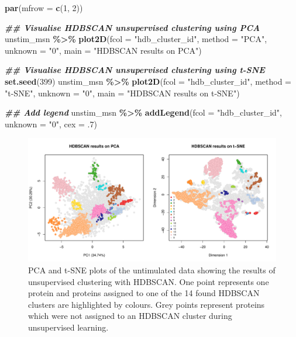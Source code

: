 \documentclass[9pt,a4paper,]{extarticle}
\newenvironment{Shaded}{\begin{snugshade}}{\end{snugshade}}
\newcommand{\AttributeTok}[1]{\textcolor[rgb]{0.13,0.29,0.53}{#1}}
\newcommand{\DecValTok}[1]{\textcolor[rgb]{0.00,0.00,0.81}{#1}}
\newcommand{\DocumentationTok}[1]{\textcolor[rgb]{0.56,0.35,0.01}{\textbf{\textit{#1}}}}
\newcommand{\FunctionTok}[1]{\textcolor[rgb]{0.13,0.29,0.53}{\textbf{#1}}}
\newcommand{\NormalTok}[1]{#1}
\newcommand{\SpecialCharTok}[1]{\textcolor[rgb]{0.81,0.36,0.00}{\textbf{#1}}}
\newcommand{\StringTok}[1]{\textcolor[rgb]{0.31,0.60,0.02}{#1}}
\begin{document}
\begin{Shaded}
\begin{Highlighting}[]
\FunctionTok{par}\NormalTok{(}\AttributeTok{mfrow =} \FunctionTok{c}\NormalTok{(}\DecValTok{1}\NormalTok{, }\DecValTok{2}\NormalTok{))}

\DocumentationTok{\#\# Visualise HDBSCAN unsupervised clustering using PCA}
\NormalTok{unstim\_msn }\SpecialCharTok{\%\textgreater{}\%}
  \FunctionTok{plot2D}\NormalTok{(}\AttributeTok{fcol =} \StringTok{"hdb\_cluster\_id"}\NormalTok{, }\AttributeTok{method =} \StringTok{"PCA"}\NormalTok{, }\AttributeTok{unknown =} \StringTok{"0"}\NormalTok{,}
         \AttributeTok{main =} \StringTok{"HDBSCAN results on PCA"}\NormalTok{)}

\DocumentationTok{\#\# Visualise HDBSCAN unsupervised clustering using t{-}SNE}
\FunctionTok{set.seed}\NormalTok{(}\DecValTok{399}\NormalTok{)}
\NormalTok{unstim\_msn }\SpecialCharTok{\%\textgreater{}\%}
  \FunctionTok{plot2D}\NormalTok{(}\AttributeTok{fcol =} \StringTok{"hdb\_cluster\_id"}\NormalTok{, }\AttributeTok{method =} \StringTok{"t{-}SNE"}\NormalTok{, }\AttributeTok{unknown =} \StringTok{"0"}\NormalTok{,}
         \AttributeTok{main =} \StringTok{"HDBSCAN results on t{-}SNE"}\NormalTok{)}

\DocumentationTok{\#\# Add legend}
\NormalTok{unstim\_msn }\SpecialCharTok{\%\textgreater{}\%} 
  \FunctionTok{addLegend}\NormalTok{(}\AttributeTok{fcol =} \StringTok{"hdb\_cluster\_id"}\NormalTok{, }\AttributeTok{unknown =} \StringTok{"0"}\NormalTok{, }\AttributeTok{cex =}\NormalTok{ .}\DecValTok{7}\NormalTok{)}
\end{Highlighting}
\end{Shaded}

\begin{figure}[H]

{\centering \includegraphics[width=0.9\linewidth,]{figs/hdbscan_results} 

}

\caption{PCA and t-SNE plots of the untimulated data showing the results of unsupervised clustering with HDBSCAN. One point represents one protein and proteins assigned to one of the 14 found HDBSCAN clusters are highlighted by colours. Grey points represent proteins which were not assigned to an HDBSCAN cluster during unsupervised learning.}\label{fig:plots-hdb}
\end{figure}
\end{document}
